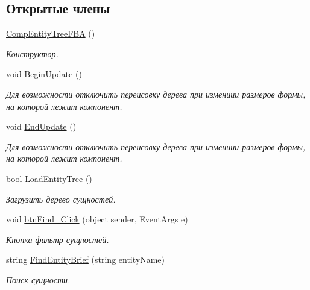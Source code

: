 \subsection*{Открытые члены}
\begin{DoxyCompactItemize}
\item 
\mbox{\hyperlink{class_f_b_a_1_1_comp_entity_tree_f_b_a_a7585d6a06bf6108a19379486072324e9}{Comp\+Entity\+Tree\+F\+BA}} ()
\begin{DoxyCompactList}\small\item\em Конструктор. \end{DoxyCompactList}\item 
void \mbox{\hyperlink{class_f_b_a_1_1_comp_entity_tree_f_b_a_a5a15d0b4323f62343af3835c6af39282}{Begin\+Update}} ()
\begin{DoxyCompactList}\small\item\em Для возможности отключить переисовку дерева при измениии размеров формы, на которой лежит компонент. \end{DoxyCompactList}\item 
void \mbox{\hyperlink{class_f_b_a_1_1_comp_entity_tree_f_b_a_a145279e9493a92335ed930fd8469c08b}{End\+Update}} ()
\begin{DoxyCompactList}\small\item\em Для возможности отключить переисовку дерева при измениии размеров формы, на которой лежит компонент. \end{DoxyCompactList}\item 
bool \mbox{\hyperlink{class_f_b_a_1_1_comp_entity_tree_f_b_a_a9482e25f569af41406b4510b9ac7421f}{Load\+Entity\+Tree}} ()
\begin{DoxyCompactList}\small\item\em Загрузить дерево сущностей. \end{DoxyCompactList}\item 
void \mbox{\hyperlink{class_f_b_a_1_1_comp_entity_tree_f_b_a_ad171409fd7ee46e8c5a94fd1044a2449}{btn\+Find\+\_\+\+Click}} (object sender, Event\+Args e)
\begin{DoxyCompactList}\small\item\em Кнопка фильтр сущностей. \end{DoxyCompactList}\item 
string \mbox{\hyperlink{class_f_b_a_1_1_comp_entity_tree_f_b_a_a8c03114e7847bd874a884cc1cecf1efe}{Find\+Entity\+Brief}} (string entity\+Name)
\begin{DoxyCompactList}\small\item\em Поиск сущности. \end{DoxyCompactList}\item 

\end{DoxyCompactItemize}
